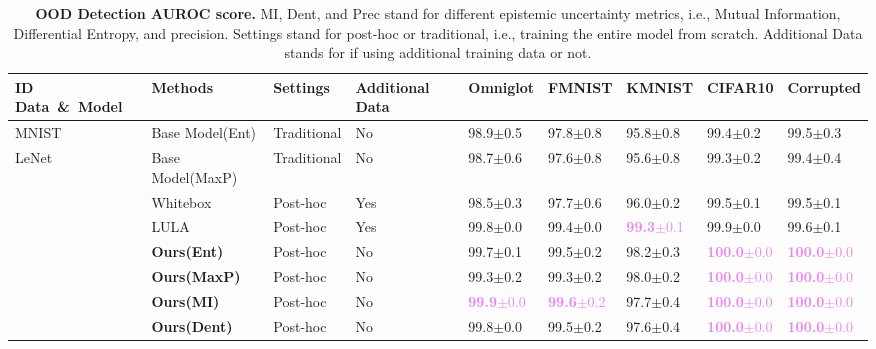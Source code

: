 \begin{table}[t]
  \begin{center}
  \scriptsize
  \captionsetup{font=small}
  \caption{\textbf{OOD Detection AUROC score.} MI, Dent, and Prec stand for different epistemic uncertainty metrics, i.e., Mutual Information, Differential Entropy, and precision. Settings stand for post-hoc or traditional, i.e., training the entire model from scratch. Additional Data stands for if using additional training data or not.}
  \vspace{-2em}
  \begin{tabular}{lllllllll}
    \\
    \toprule
    \textbf{ID Data}\ \&\ \textbf{Model} & \textbf{Methods} & \textbf{Settings} & \textbf{Additional Data} & \textbf{Omniglot}& \textbf{FMNIST} & \textbf{KMNIST}& \textbf{CIFAR10} &\textbf{Corrupted} \\
    \hline
    MNIST & Base Model(Ent) & Traditional & No & 98.9$\pm$0.5 & 97.8$\pm$0.8 & 95.8$\pm$0.8 & 99.4$\pm$0.2 & 99.5$\pm$0.3  \\
    LeNet & Base Model(MaxP) & Traditional & No & 98.7$\pm$0.6 & 97.6$\pm$0.8 & 95.6$\pm$0.8 & 99.3$\pm$0.2 & 99.4$\pm$0.4  \\
              & Whitebox & Post-hoc & Yes & 98.5$\pm$0.3 & 97.7$\pm$0.6 & 96.0$\pm$0.2 & 99.5$\pm$0.1 & 99.5$\pm$0.1  \\
              & LULA & Post-hoc & Yes & 99.8$\pm$0.0 & 99.4$\pm$0.0 & \textcolor{violet}{\textbf{99.3}$\pm$0.1} & 99.9$\pm$0.0 & 99.6$\pm$0.1  \\
    \hline
              & \textbf{Ours(Ent)} & Post-hoc & No & 99.7$\pm$0.1 & 99.5$\pm$0.2 & 98.2$\pm$0.3 &  \textcolor{violet}{\textbf{100.0}$\pm$0.0} & \textcolor{violet}{\textbf{100.0}$\pm$0.0} \\
              & \textbf{Ours(MaxP)} & Post-hoc & No & 99.3$\pm$0.2 & 99.3$\pm$0.2 & 98.0$\pm$0.2 &  \textcolor{violet}{\textbf{100.0}$\pm$0.0} & \textcolor{violet}{\textbf{100.0}$\pm$0.0} \\
              & \textbf{Ours(MI)} & Post-hoc & No & \textcolor{violet}{\textbf{99.9}$\pm$0.0} & \textcolor{violet}{\textbf{99.6}$\pm$0.2} &97.7$\pm$0.4 &  \textcolor{violet}{\textbf{100.0}$\pm$0.0} & \textcolor{violet}{\textbf{100.0}$\pm$0.0} \\
              & \textbf{Ours(Dent)} & Post-hoc & No & 99.8$\pm$0.0 & 99.5$\pm$0.2 & 97.6$\pm$0.4 & \textcolor{violet}{\textbf{100.0}$\pm$0.0} & \textcolor{violet}{\textbf{100.0}$\pm$0.0} \\

\end{tabular}
\end{center}
\end{table}
